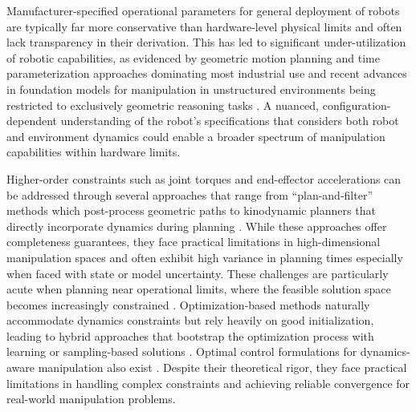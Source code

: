 Manufacturer-specified operational parameters for general deployment of robots are typically far more conservative than hardware-level physical limits and often lack transparency in their derivation.
This has led to significant under-utilization of robotic capabilities, as evidenced by geometric motion planning and time parameterization approaches dominating most industrial use \cite{berscheid2021jerk,coleman2014reducing,orthey2023sampling} and recent advances in foundation models for manipulation in unstructured environments being restricted to exclusively geometric reasoning tasks \cite{o2024open,team2024octo,zitkovich2023rt}.
A nuanced, configuration-dependent understanding of the robot's specifications that considers both robot and environment dynamics could enable a broader spectrum of manipulation capabilities within hardware limits.

Higher-order constraints such as joint torques and end-effector accelerations can be addressed through several approaches that range from ``plan-and-filter'' methods which post-process geometric paths \cite{abderezaei2024clutter,kuntz2019fast} to kinodynamic planners that directly incorporate dynamics during planning \cite{li2015sparse,nayak2022bidirectional,pasricha2024virtues}.
While these approaches offer completeness guarantees, they face practical limitations in high-dimensional manipulation spaces and often exhibit high variance in planning times especially when faced with state or model uncertainty.
These challenges are particularly acute when planning near operational limits, where the feasible solution space becomes increasingly constrained \cite{kingston2018sampling}.
Optimization-based methods naturally accommodate dynamics constraints but rely heavily on good initialization, leading to hybrid approaches that bootstrap the optimization process with learning or sampling-based solutions \cite{ichnowski2020deep,kuntz2019fast,yan2024impact}.
Optimal control formulations for dynamics-aware manipulation also exist \cite{arrizabalaga2024slosh,kim2014catching}. Despite their theoretical rigor, they face practical limitations in handling complex constraints and achieving reliable convergence for real-world manipulation problems.

